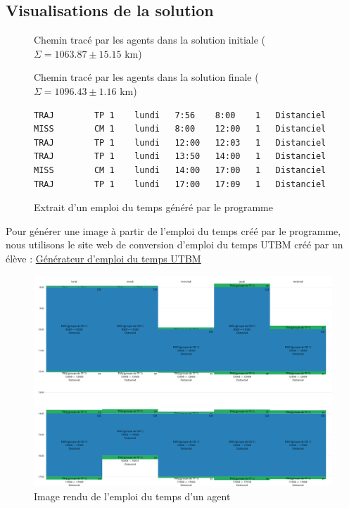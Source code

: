\documentclass[11pt]{article}
\begin{document}
\subsection{Visualisations de la solution}

\begin{figure}[H]
    \caption{Chemin tracé par les agents dans la solution initiale ($\Sigma = 1063.87 \pm 15.15$ km)}
    
\end{figure}

\begin{figure}[H]
    \caption{Chemin tracé par les agents dans la solution finale ($\Sigma = 1096.43 \pm 1.16$ km)}
    
\end{figure}


\newpage
\begin{figure}[H]
    \centering
    \begin{lstlisting}
TRAJ 		TP 1 	lundi 	7:56 	8:00 	1 	Distanciel
MISS 		CM 1 	lundi 	8:00 	12:00 	1 	Distanciel
TRAJ 		TP 1 	lundi 	12:00 	12:03 	1 	Distanciel
TRAJ 		TP 1 	lundi 	13:50 	14:00 	1 	Distanciel
MISS 		CM 1 	lundi 	14:00 	17:00 	1 	Distanciel
TRAJ 		TP 1 	lundi 	17:00 	17:09 	1 	Distanciel
    \end{lstlisting}
    \caption{Extrait d'un emploi du temps généré par le programme}
    \label{fig:edt_raw}
\end{figure}


Pour générer une image à partir de l'emploi du temps créé par le programme, nous utilisons le site web de conversion d'emploi du temps UTBM créé par un élève : \href{https://codepen.io/TheRolf/full/gGbBoY?fbclid=IwAR0FcviTmRmV4PZjW4q8sscpVDDdAWsLMJvw682CjDEalOuPSbtQtzLUV24}{Générateur d'emploi du temps UTBM}


\begin{figure}[H]
    \centering
    \includegraphics[width=1\textwidth]{Images/edt.png}
    \caption{Image rendu de l'emploi du temps d'un agent}
    \label{fig:edt}
\end{figure}
\end{document}
